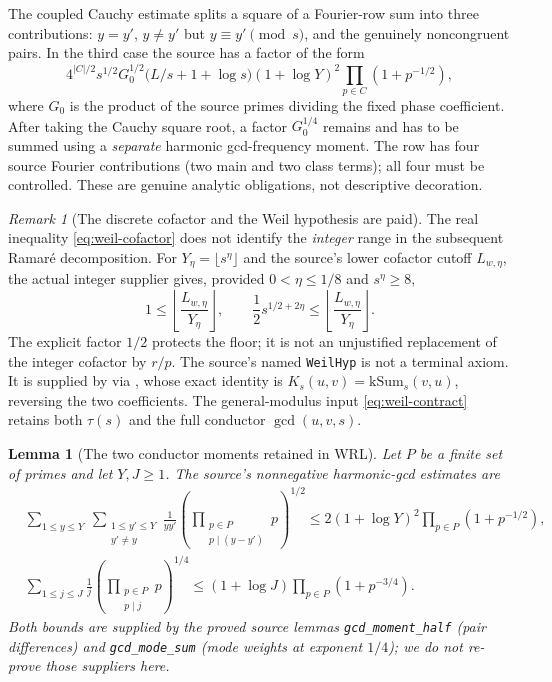 \documentclass[11pt]{article}
\newtheorem{lemma}[theorem]{Lemma}
\theoremstyle{definition}
\theoremstyle{remark}
\newtheorem{remark}[theorem]{Remark}
\newcommand{\1}{\mathbf 1}
\begin{document}
The coupled Cauchy estimate splits a square of a Fourier-row
sum into three contributions: $y=y'$, $y\ne y'$ but
$y\equiv y'\pmod s$, and the genuinely noncongruent pairs.
In the third case the source has a factor of the form
\[
 4^{|C|/2}s^{1/2}G_0^{1/2}
 \bigl(L/s+1+\log s\bigr)
 (1+\log Y)^2
 \prod_{p\in C}(1+p^{-1/2}),
\]
where $G_0$ is the product of the source primes dividing the
fixed phase coefficient. After taking the Cauchy square root,
a factor $G_0^{1/4}$ remains and has to be summed using a
\emph{separate} harmonic gcd-frequency moment. The row
has four source Fourier contributions (two main and two
class terms); all four must be controlled. These are genuine
analytic obligations, not descriptive decoration.


\begin{remark}[The discrete cofactor and the Weil hypothesis are paid]
\label{rem:wrl-discrete-weil}
The real inequality \eqref{eq:weil-cofactor} does not identify the
\emph{integer} range in the subsequent Ramar\'e decomposition.
For $Y_\eta=\lfloor s^\eta\rfloor$ and the source's lower
cofactor cutoff $L_{w,\eta}$, the actual integer supplier gives,
provided $0<\eta\le1/8$ and $s^\eta\ge8$,
\begin{equation}\label{eq:wrl-integer-cofactor}
 1\le\left\lfloor\frac{L_{w,\eta}}{Y_\eta}\right\rfloor,
 \qquad
 \frac12s^{1/2+2\eta}
 \le\left\lfloor\frac{L_{w,\eta}}{Y_\eta}\right\rfloor.
\end{equation}
The explicit factor $1/2$ protects the floor; it is not an
unjustified replacement of the integer cofactor by $r/p$.
The source's named \texttt{WeilHyp} is not a terminal axiom.
It is supplied by  via
, whose exact identity is
$K_s(u,v)=\mathrm{kSum}_s(v,u)$, reversing the two coefficients.
The general-modulus input \eqref{eq:weil-contract} retains both
$\tau(s)$ and the full conductor $\gcd(u,v,s)$.
\end{remark}

\begin{lemma}[The two conductor moments retained in WRL]
\label{lem:wrl-moments}
Let $P$ be a finite set of primes and let $Y,J\ge1$.
The source's nonnegative harmonic-gcd estimates are
\begin{align}
&\sum_{1\le y\le Y}\ \sum_{\substack{1\le y'\le Y\\y'\ne y}}
 \frac1{yy'}
 \left(\prod_{\substack{p\in P\\p\mid(y-y')}}p\right)^{1/2}
 \le 2(1+\log Y)^2\prod_{p\in P}(1+p^{-1/2}),
 \label{eq:wrl-pair-moment}\\
&\sum_{1\le j\le J}\frac1j
 \left(\prod_{\substack{p\in P\\p\mid j}}p\right)^{1/4}
 \le(1+\log J)\prod_{p\in P}(1+p^{-3/4}).
 \label{eq:wrl-mode-moment}
\end{align}
Both bounds are supplied by the proved source lemmas
\texttt{gcd\_moment\_half} (pair differences) and
\texttt{gcd\_mode\_sum} (mode weights at exponent $1/4$);
we do not re-prove those suppliers here.
\end{lemma}
\end{document}
